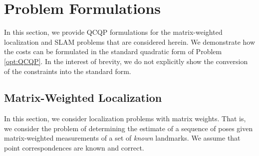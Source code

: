 \documentclass[lettersize,journal]{IEEEtran}
\begin{document}
\section{Problem Formulations}\label{sec:Formulations}

In this section, we provide QCQP formulations for the matrix-weighted localization and SLAM problems that are considered herein. We demonstrate how the costs can be formulated in the standard quadratic form of Problem \eqref{opt:QCQP}. In the interest of brevity, we do not explicitly show the conversion of the constraints into the standard form.

\subsection{Matrix-Weighted Localization}\label{sec:Localization}

In this section, we consider localization problems with matrix weights. That is, we consider the problem of determining the estimate of a sequence of poses given matrix-weighted measurements of a set of \emph{known} landmarks. We assume that point correspondences are known and correct. 
\end{document}
